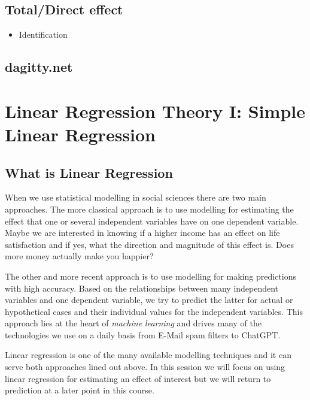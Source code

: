 \documentclass[
]{book}
\providecommand{\tightlist}{%
  \setlength{\itemsep}{0pt}\setlength{\parskip}{0pt}}
\begin{document}
\hypertarget{totaldirect-effect}{%
\section{Total/Direct effect}\label{totaldirect-effect}}

\begin{itemize}
\tightlist
\item
  Identification
\end{itemize}

\hypertarget{dagitty.net}{%
\section{dagitty.net}\label{dagitty.net}}

\hypertarget{lin-t-1}{%
\chapter{Linear Regression Theory I: Simple Linear Regression}\label{lin-t-1}}

\hypertarget{what-is-linear-regression}{%
\section{What is Linear Regression}\label{what-is-linear-regression}}

When we use statistical modelling in social sciences there are two main
approaches.
The more classical approach is to use modelling for estimating the effect that
one or several independent variables have on one dependent variable. Maybe we
are interested in knowing if a higher income has an effect on life satisfaction
and if yes, what the direction and magnitude of this effect is. Does more money
actually make you happier?

The other and more recent approach is to use modelling for making predictions
with high accuracy. Based on the relationships between many independent
variables and one dependent variable, we try to predict the latter for actual
or hypothetical cases and their individual values for the independent variables.
This approach lies at the heart of \emph{machine learning} and drives many of the
technologies we use on a daily basis from E-Mail spam filters to ChatGPT.

Linear regression is one of the many available modelling techniques and it can
serve both approaches lined out above. In this session we will focus on using
linear regression for estimating an effect of interest but we will return to
prediction at a later point in this course.
\end{document}
